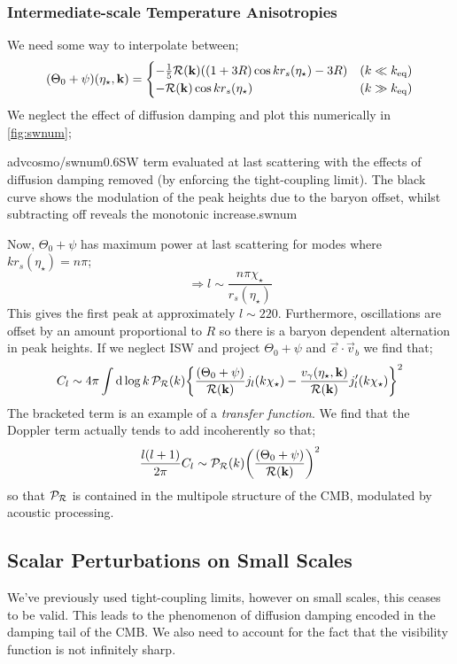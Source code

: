\subsubsection{Intermediate-scale Temperature Anisotropies}
We need some way to interpolate between;
\begin{equation*}
\left(\Theta_0 + \psi\right)(\eta_\star, \vec{k}) = \begin{cases}-\frac{1}{5}\mR(\vec{k})\left((1 + 3R)\cos kr_s(\eta_\star) - 3R\right)&(k \ll k_{\text{eq}}) \\ -\mR(\vec{k})\cos kr_s(\eta_\star)&(k \gg k_{\text{eq}})\end{cases}
\end{equation*}
We neglect the effect of diffusion damping and plot this numerically in \autoref{fig:swnum};
\begin{mygraphic}{advcosmo/swnum}{0.6}{SW term evaluated at last scattering with the effects of diffusion damping removed (by enforcing the tight-coupling limit). The black curve shows the modulation of the peak heights due to the baryon offset, whilst subtracting off reveals the monotonic increase.}{swnum}\end{mygraphic}
Now, $\Theta_0 + \psi$ has maximum power at last scattering for modes where $kr_s(\eta_\star) = n\pi$;
\begin{equation}
\Rightarrow l \sim \frac{n\pi\chi_\star}{r_s(\eta_\star)}
\end{equation}
This gives the first peak at approximately $l \sim 220$. Furthermore, oscillations are offset by an amount proportional to $R$ so there is a baryon dependent alternation in peak heights. If we neglect ISW and project $\Theta_0 + \psi$ and $\vec{e}\cdot \vec{v}_b$ we find that;
\begin{equation}
C_l \sim 4\pi \int{\upd{\log k}\mathcal{P}_{\mR}(k)\set{\frac{(\Theta_0 + \psi)}{\mR(\vec{k})}j_l(k\chi_\star) - \frac{v_\gamma(\eta_\star, \vec{k})}{\mR(\vec{k})}j_l\pr(k\chi_\star)}^2}
\end{equation}
The bracketed term is an example of a \emph{transfer function}. We find that the Doppler term actually tends to add incoherently so that;
\begin{equation}
\frac{l(l + 1)}{2\pi}C_l \sim \mathcal{P}_{\mR}(k)\left(\frac{(\Theta_0 + \psi)}{\mR(\vec{k})}\right)^2 
\end{equation}
so that $\mathcal{P}_{\mathcal{R}}$ is contained in the multipole structure of the CMB, modulated by acoustic processing.
\subsection{Scalar Perturbations on Small Scales}
We've previously used tight-coupling limits, however on small scales, this ceases to be valid. This leads to the phenomenon of diffusion damping encoded in the damping tail of the CMB. We also need to account for the fact that the visibility function is not infinitely sharp.
